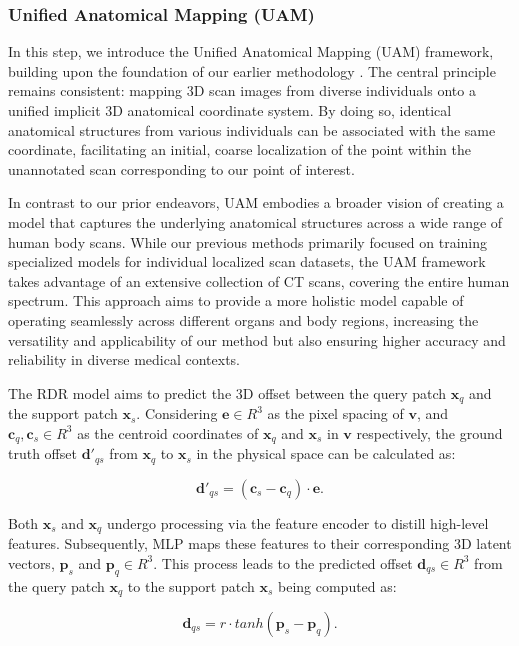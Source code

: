 \documentclass[times,twocolumn,final]{elsarticle}
\begin{document}
\subsubsection{Unified Anatomical Mapping (UAM)}
\label{sec:3.1.1}
In this step, we introduce the Unified Anatomical Mapping (UAM) framework, building upon the foundation of our earlier methodology \citep{lei2021contrastive}. The central principle remains consistent: mapping 3D scan images from diverse individuals onto a unified implicit 3D anatomical coordinate system. By doing so, identical anatomical structures from various individuals can be associated with the same coordinate, facilitating an initial, coarse localization of the point within the unannotated scan corresponding to our point of interest.

In contrast to our prior endeavors, UAM embodies a broader vision of creating a model that captures the underlying anatomical structures across a wide range of human body scans. While our previous methods primarily focused on training specialized models for individual localized scan datasets, the UAM framework takes advantage of an extensive collection of CT scans, covering the entire human spectrum. This approach aims to provide a more holistic model capable of operating seamlessly across different organs and body regions, increasing the versatility and applicability of our method but also ensuring higher accuracy and reliability in diverse medical contexts.

The RDR model aims to predict the 3D offset between the query patch $\bm{x}_q$ and the support patch $\bm{x}_s$. Considering $\bm{e} \in R^3$ as the pixel spacing of $\bm{v}$, and $\bm{c}_q, \bm{c}_s \in R^3$ as the centroid coordinates of $\bm{x}_q$ and $\bm{x}_s$ in $\bm{v}$ respectively, the ground truth offset $\bm{d}'_{qs}$ from $\bm{x}_q$ to $\bm{x}_s$ in the physical space can be calculated as:

\begin{equation}
\bm{d}'_{qs}= (\bm{c}_s-\bm{c}_q) \cdot \bm{e} .
\end{equation}

Both $\bm{x}_s$ and $\bm{x}_q$ undergo processing via the feature encoder to distill high-level features. Subsequently, MLP maps these features to their corresponding 3D latent vectors, $\bm{p}_s$ and $\bm{p}_q \in R^3$. This process leads to the predicted offset $\bm{d}_{qs} \in R^3$ from the query patch $\bm{x}_q$ to the support patch $\bm{x}_s$ being computed as:

\begin{equation}
 \bm{d}_{qs}= r \cdot tanh(\bm{p}_{s}-\bm{p}_{q}) .
\end{equation}
\end{document}

